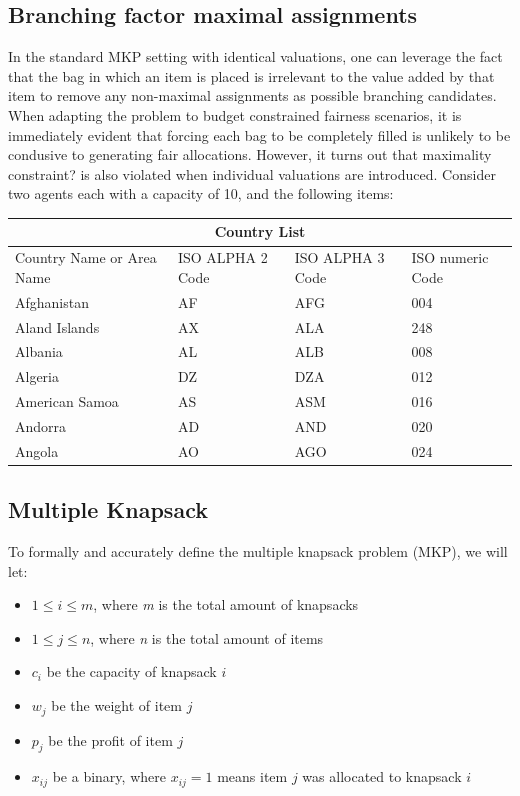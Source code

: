 \documentclass[b5paper]{article}
\begin{document}
\subsection{Branching factor maximal assignments}
In the standard MKP setting with identical valuations, one can leverage the fact that the bag in which an item is placed is irrelevant to the value added by that item
to remove any non-maximal assignments as possible branching candidates.
When adapting the problem to budget constrained fairness scenarios, it is immediately evident that forcing each bag to be completely filled is unlikely to
be condusive to generating fair allocations. 
However, it turns out that maximality constraint? is also violated when individual valuations are introduced.
Consider two agents each with a capacity of 10, and the following items:
\begin{tabular}{ |p{3cm}||p{3cm}|p{3cm}|p{3cm}|  }
 \hline
 \multicolumn{4}{|c|}{Country List} \\
 \hline
 Country Name or Area Name& ISO ALPHA 2 Code &ISO ALPHA 3 Code&ISO numeric Code\\
 \hline
 Afghanistan   & AF    &AFG&   004\\
 Aland Islands&   AX  & ALA   &248\\
 Albania &AL & ALB&  008\\
 Algeria    &DZ & DZA&  012\\
 American Samoa&   AS  & ASM&016\\
 Andorra& AD  & AND   &020\\
 Angola& AO  & AGO&024\\
 \hline
\end{tabular}

\subsection{Multiple Knapsack}

To formally and accurately define the multiple knapsack problem (MKP), we will let:
\begin{itemize}
    \itemsep0.2em
    \item $1 \leq i \leq m $, where \textit{m} is the total amount of knapsacks
    \item $1 \leq j \leq n $, where \textit{n} is the total amount of items
    \item $c_i$ be the capacity of knapsack $i$
    \item $w_j$ be the weight of item $j$
    \item $p_j$ be the profit of item $j$
    \item $x_{ij}$ be a binary, where $x_{ij}=1$ means item $j$ was allocated to knapsack $i$
\end{itemize}
\end{document}
